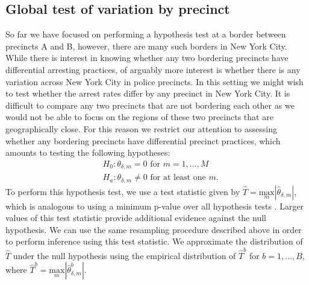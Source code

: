 \documentclass[a4paper,11pt]{article}
\begin{document}
\subsection{Global test of variation by precinct}
\label{sec:Global}

So far we have focused on performing a hypothesis test at a border between precincts A and B, however, there are many such borders in New York City. While there is interest in knowing whether any two bordering precincts have differential arresting practices, of arguably more interest is whether there is any variation across New York City in police precincts. In this setting we might wish to test whether the arrest rates differ by any precinct in New York City. It is difficult to compare any two precincts that are not bordering each other as we would not be able to focus on the regions of these two precincts that are geographically close. For this reason we restrict our attention to assessing whether any bordering precincts have differential precinct practices, which amounts to testing the following hypotheses:
\begin{align*}
    & H_0: \theta_{\delta, m} = 0 \text{ for } m=1, \dots, M \\
    & H_a: \theta_{\delta, m} \neq 0 \text{ for at least one } m.
\end{align*}
To perform this hypothesis test, we use a test statistic given by $\widehat{T} = \underset{m}{\text{max}} |\widehat{\theta}_{\delta, m}|$, which is analogous to using a minimum p-value over all hypothesis tests \citep{tippett1931methods}. Larger values of this test statistic provide additional evidence against the null hypothesis. We can use the same resampling procedure described above in order to perform inference using this test statistic. We approximate the distribution of $\widehat{T}$ under the null hypothesis using the empirical distribution of $\widehat{T}^b$ for $b=1, \dots, B$, where $\widehat{T}^b = \underset{m}{\text{max}} |\widehat{\theta}_{\delta, m}^b|$. 



\end{document}
